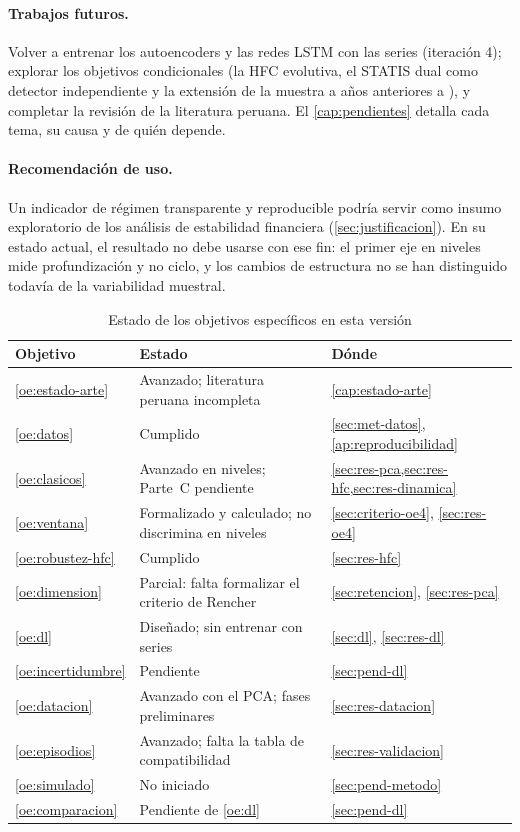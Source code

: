 \paragraph{Trabajos futuros.} Volver a entrenar los autoencoders y las redes LSTM con las
\nSeries{} series (iteración 4); explorar los objetivos condicionales (la HFC evolutiva, el STATIS
dual como detector independiente y la extensión de la muestra a años anteriores a
\anioInicioDatos{}), y completar la revisión de la literatura peruana. El \cref{cap:pendientes}
detalla cada tema, su causa y de quién depende.

\paragraph{Recomendación de uso.} Un indicador de régimen transparente y reproducible podría
servir como insumo exploratorio de los análisis de estabilidad financiera (\cref{sec:justificacion}).
En su estado actual, el resultado no debe usarse con ese fin: el primer eje en niveles mide
profundización y no ciclo, y los cambios de estructura no se han distinguido todavía de la
variabilidad muestral.

\begin{table}[htbp]
\centering
\small
\caption{Estado de los objetivos específicos en esta versión}
\label{tab:estado-objetivos}
\begin{tabular}{@{}l>{\raggedright\arraybackslash}p{}>{\raggedright\arraybackslash}p{}@{}}
\toprule
Objetivo & Estado & Dónde \\
\midrule
\ref{oe:estado-arte} & Avanzado; literatura peruana incompleta & \cref{cap:estado-arte} \\
\ref{oe:datos} & Cumplido & \cref{sec:met-datos}, \cref{ap:reproducibilidad} \\
\ref{oe:clasicos} & Avanzado en niveles; Parte~C pendiente & \cref{sec:res-pca,sec:res-hfc,sec:res-dinamica} \\
\ref{oe:ventana} & Formalizado y calculado; no discrimina en niveles & \cref{sec:criterio-oe4}, \cref{sec:res-oe4} \\
\ref{oe:robustez-hfc} & Cumplido & \cref{sec:res-hfc} \\
\ref{oe:dimension} & Parcial: falta formalizar el criterio de Rencher & \cref{sec:retencion}, \cref{sec:res-pca} \\
\ref{oe:dl} & Diseñado; sin entrenar con \nSeries{} series & \cref{sec:dl}, \cref{sec:res-dl} \\
\ref{oe:incertidumbre} & Pendiente & \cref{sec:pend-dl} \\
\ref{oe:datacion} & Avanzado con el PCA; fases preliminares & \cref{sec:res-datacion} \\
\ref{oe:episodios} & Avanzado; falta la tabla de compatibilidad & \cref{sec:res-validacion} \\
\ref{oe:simulado} & No iniciado & \cref{sec:pend-metodo} \\
\ref{oe:comparacion} & Pendiente de \ref{oe:dl} & \cref{sec:pend-dl} \\
\bottomrule
\end{tabular}
\end{table}
